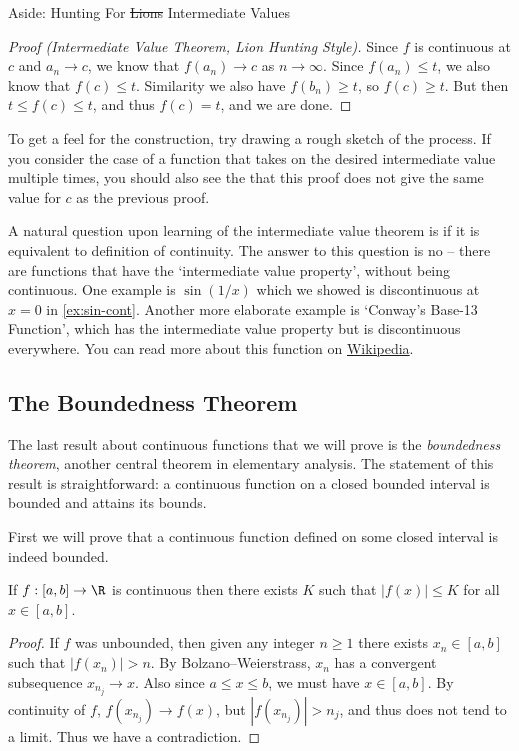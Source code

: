 \documentclass[a4paper]{scrartcl}
\begin{document}
\begin{aside}{Aside: Hunting For \st{Lions} Intermediate Values}
\begin{proof}[Proof (Intermediate Value Theorem, Lion Hunting Style)]
Since $f$ is continuous at $c$ and $a_n \rightarrow c$, we know that $f(a_n) \rightarrow c$ as $n \rightarrow \infty$. Since $f(a_n) \leq t$, we also know that $f(c) \leq t$. Similarity we also have $f(b_n) \geq t$, so $f(c) \geq t$. But then $t \leq f(c) \leq t$, and thus $f(c) = t$, and we are done.
	\end{proof}

	To get a feel for the construction, try drawing a rough sketch of the process. If you consider the case of a function that takes on the desired intermediate value multiple times, you should also see the that this proof does not give the same value for $c$ as the previous proof.

\end{aside}


A natural question upon learning of the intermediate value theorem is if it is equivalent to definition of continuity. The answer to this question is no -- there are functions that have the `intermediate value property', without being continuous. One example is $\sin(1/x)$ which we showed is discontinuous at $x = 0$ in \autoref{ex:sin-cont}. Another more elaborate example is `Conway's Base-13 Function', which has the intermediate value property but is discontinuous everywhere. You can read more about this function on \href{https://en.wikipedia.org/wiki/Conway_base_13_function}{Wikipedia}.


\subsection{The Boundedness Theorem}

The last result about continuous functions that we will prove is the \emph{boundedness theorem}, another central theorem in elementary analysis. The statement of this result is straightforward: a continuous function on a closed bounded interval is bounded and attains its bounds.

First we will prove that a continuous function defined on some closed interval is indeed bounded.
\begin{lemma}
	If $f:[a, b] \rightarrow \R$ is continuous then there exists $K$ such that $|f(x)| \leq K$ for all $x \in [a, b]$.
\end{lemma}
\begin{proof}
If $f$ was unbounded, then given any integer $n \geq 1$ there exists $x_n \in [a, b]$ such that $|f(x_n)| > n$. By Bolzano–Weierstrass, $x_n$ has a convergent subsequence $x_{n_j} \rightarrow x$. Also since $a \leq x \leq b$, we must have $x \in [a, b]$.
By continuity of $f$, $f(x_{n_j}) \rightarrow f(x)$, but $|f(x_{n_j})| > n_j$, and thus does not tend to a limit. Thus we have a contradiction.
\end{proof}
\end{document}
